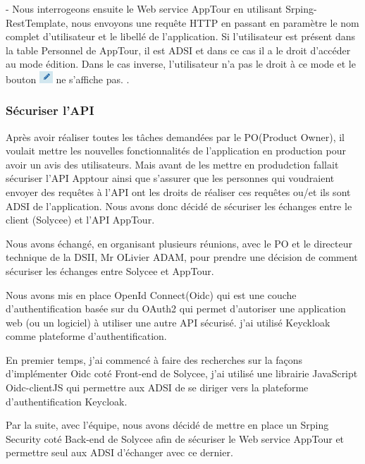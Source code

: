 \documentclass[12pt]{article}
\begin{document}
- Nous interrogeons ensuite le Web service AppTour en utilisant  Srping-RestTemplate\footnotemark, nous envoyons une requête HTTP en passant en paramètre le nom complet d'utilisateur et le libellé de l'application. Si l'utilisateur est présent dans la table Personnel de AppTour, il est ADSI et dans ce cas il a le droit d'accéder au mode édition. Dans le cas inverse, l'utilisateur n'a pas le droit à ce mode et le bouton \includegraphics[width=5mm,scale=0.5]{diagrammes/Bouton_modeEdition.png} ne s'affiche pas.
.\\


\subsubsection{Sécuriser l'API}

Après avoir réaliser toutes les tâches demandées par le PO(Product Owner), il voulait mettre les nouvelles fonctionnalités de l'application en production pour avoir un avis des utilisateurs. Mais avant de les mettre en produdction fallait sécuriser l'API Apptour ainsi que s'assurer que les personnes qui voudraient envoyer des requêtes à l'API ont les droits de réaliser ces requêtes ou/et ils sont ADSI de l'application. Nous avons donc décidé de sécuriser les échanges entre le client (Solycee) et l'API AppTour. 


Nous avons échangé, en organisant plusieurs réunions, avec le PO et le directeur technique de la DSII, Mr OLivier ADAM, pour prendre une décision de comment sécuriser les échanges entre  Solycee et AppTour. 


Nous avons mis en place OpenId Connect(Oidc) qui est une couche d'authentification basée sur du OAuth2 qui permet d'autoriser une application web (ou un logiciel) à utiliser une autre API sécurisé. j'ai utilisé Keyckloak comme plateforme d'authentification. 

En premier temps, j'ai commencé à faire des recherches sur la façons d'implémenter Oidc coté Front-end de Solycee, j'ai utilisé une librairie JavaScript Oidc-clientJS qui permettre aux ADSI de se diriger vers la plateforme d'authentification Keycloak.

Par la suite, avec l'équipe, nous avons décidé de mettre en place un Srping Security coté Back-end de Solycee afin de sécuriser le Web service AppTour et permettre seul aux ADSI d'échanger avec ce dernier.  
 
\end{document}
